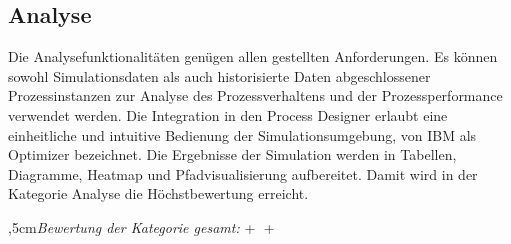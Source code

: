 
\subsection{Analyse}

Die Analysefunktionalitäten genügen allen gestellten Anforderungen. Es können sowohl Simulationsdaten als auch historisierte Daten abgeschlossener Prozessinstanzen zur Analyse des Prozessverhaltens und der Prozessperformance verwendet werden. Die Integration in den Process Designer erlaubt eine einheitliche und intuitive Bedienung der Simulationsumgebung, von IBM als Optimizer bezeichnet. Die Ergebnisse der Simulation werden in Tabellen, Diagramme, Heatmap und Pfadvisualisierung aufbereitet. Damit wird in der Kategorie Analyse die Höchstbewertung erreicht.

\bigskip{},5cm\textit{Bewertung der Kategorie gesamt:} \hspace{5mm} \textcircled{+} \textcircled{+}
\leftskip=0cm

